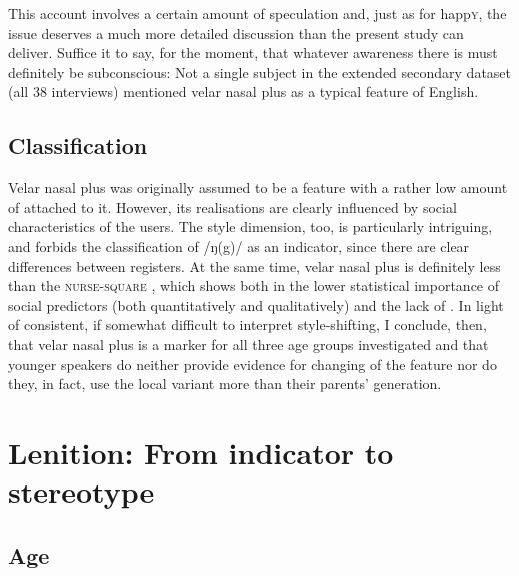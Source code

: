 This account involves a certain amount of speculation and, just as for happ\textsc{y}, the issue deserves a much more detailed discussion than the present study can deliver.
Suffice it to say, for the moment, that whatever awareness there is must definitely be subconscious: Not a single subject in the extended secondary dataset (all 38 interviews) mentioned velar nasal plus as a typical feature of  English.

\subsection{Classification}
\label{prod.disc.ng.classification}

Velar nasal plus was originally assumed to be a feature with a rather low amount of  attached to it.
However, its realisations are clearly influenced by social characteristics of the users.
The style dimension, too, is particularly intriguing, and forbids the classification of /ŋ(g)/ as an indicator, since there are clear differences between registers.
At the same time, velar nasal plus is definitely less  than the \textsc{nurse}-\textsc{square} , which shows both in the lower statistical importance of social predictors (both quantitatively and qualitatively) and the lack of .
In light of consistent, if somewhat difficult to interpret style-shifting, I conclude, then, that velar nasal plus is a marker for all three age groups investigated and that younger speakers do neither provide evidence for changing  of the feature nor do they, in fact, use the local variant more than their parents' generation.

\section{Lenition: From indicator to stereotype}
\label{prod.disc.k}

\subsection{Age}
\label{prod.disc.k.age}

